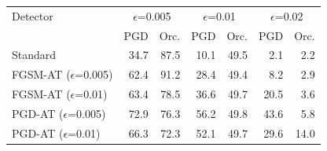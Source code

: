\begin{tabular}{lrrrrrr}
\toprule
Detector & \multicolumn{2}{c}{$\epsilon$=0.005} & \multicolumn{2}{c}{$\epsilon$=0.01} & \multicolumn{2}{c}{$\epsilon$=0.02} \\
 & PGD & Orc. & PGD & Orc. & PGD & Orc. \\
\midrule
Standard & 34.7 & 87.5 & 10.1 & 49.5 & 2.1 & 2.2 \\
FGSM-AT ($\epsilon$=0.005) & 62.4 & 91.2 & 28.4 & 49.4 & 8.2 & 2.9 \\
FGSM-AT ($\epsilon$=0.01) & 63.4 & 78.5 & 36.6 & 49.7 & 20.5 & 3.6 \\
PGD-AT ($\epsilon$=0.005) & 72.9 & 76.3 & 56.2 & 49.8 & 43.6 & 5.8 \\
PGD-AT ($\epsilon$=0.01) & 66.3 & 72.3 & 52.1 & 49.7 & 29.6 & 14.0 \\
\bottomrule
\end{tabular}
